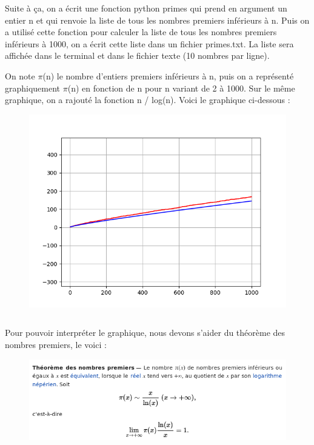 \documentclass{article}
\begin{document}
Suite à ça, on a écrit une fonction python primes qui prend en argument un entier n et qui renvoie la liste de tous les nombres premiers inférieurs à n. Puis on a utilisé cette fonction pour calculer la liste de tous les nombres premiers inférieurs à 1000, on a écrit cette liste dans un fichier primes.txt. La liste sera affichée dans le terminal et dans le fichier texte (10 nombres par ligne).
\newline
\newline

On note $\pi$(n) le nombre d'entiers premiers inférieurs à n, puis on a représenté graphiquement $\pi$(n) en fonction de n pour n variant de 2 à 1000. Sur le même graphique, on a rajouté la fonction n / log(n). Voici le graphique ci-dessous :
\newline
\newline
\begin{figure}
        \centering
        \includegraphics[width=1\textwidth]{graph2.png}
\end{figure}

$$ $$
$$ $$
$$ $$
$$ $$
$$ $$
$$ $$
$$ $$
$$ $$
$$ $$
$$ $$
$$ $$
$$ $$
$$ $$

Pour pouvoir interpréter le graphique, nous devons s'aider du théorème des nombres premiers, le voici :

\begin{figure}
        \centering
        \includegraphics[width=1\textwidth]{theor.png}
\end{figure}
\end{document}
